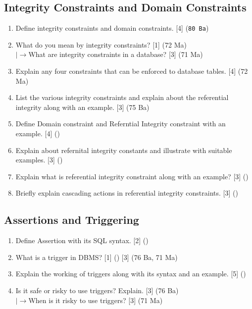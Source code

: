 \documentclass[12pt]{article}
\newcommand{\lb}{\\$\left|\rightarrow\right.$}
\begin{document}
    \subsection{Integrity Constraints and Domain Constraints}
    \begin{enumerate}[noitemsep, topsep = 0pt]
        \item Define integrity constraints and domain constraints. \hfill [4] (\texttt{80 Ba})
        
        \item What do you mean by integrity constraints? \hfill [1] (72 Ma)
        \lb What are integrity constraints in a database? \hfill [3] (71 Ma)
        
        \item Explain any four constraints that can be enforced to database tables. \hfill [4] (72 Ma)
        
        \item List the various integrity constraints and explain about the referential integrity along with an example. \hfill [3] (75 Ba)
        
        \item Define Domain constraint and Referntial Integrity constraint with an example. \hfill [4] ()
        
        \item Explain about refernital integrity constants and illustrate with suitable examples. \hfill [3] ()
        
        \item Explain what is referential integrity constraint along with an example? \hfill [3] ()
        
        \item Briefly explain cascading actions in referential integrity constraints. \hfill [3] ()
    \end{enumerate}

    \subsection{Assertions and Triggering}
    \begin{enumerate}[noitemsep, topsep = 0pt]
        \item Define Assertion with its SQL syntax. \hfill [2] ()

        \item What is a trigger in DBMS? \hfill [1] () [3] (76 Ba, 71 Ma)
        
        \item Explain the working of triggers along with its syntax and an example. \hfill [5] ()
        
        \item Is it safe or risky to use triggers? Explain. \hfill [3] (76 Ba)
        \lb When is it risky to use triggers? \hfill [3] (71 Ma)
    \end{enumerate}
\end{document}
